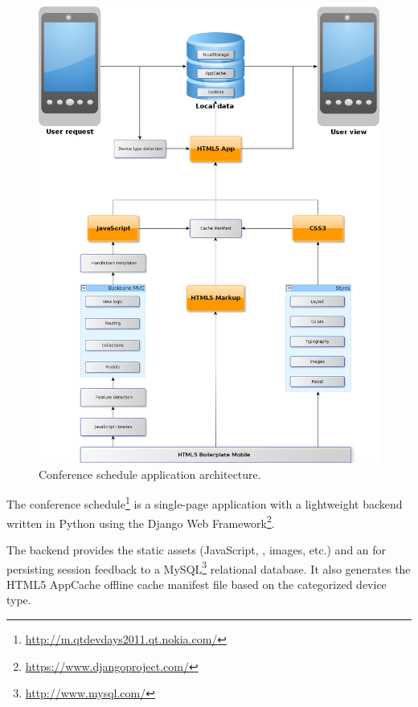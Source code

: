 \begin{figure}[ht]
  \begin{center}
    \includegraphics[width=\textwidth]{images/devdays.png}
    \caption{Conference schedule application architecture.}
    \label{figure:devdays.png}
  \end{center}
\end{figure}

The conference
schedule\footnote{\url{http://m.qtdevdays2011.qt.nokia.com/}} is a
single-page application \citationneeded with a lightweight backend
written in Python using the Django Web
Framework\footnote{\url{https://www.djangoproject.com/}}.

The backend provides the static assets (JavaScript, ,
images, etc.) and an  for persisting session feedback to a
MySQL\footnote{\url{http://www.mysql.com/}} relational database. It
also generates the HTML5 AppCache \citationneeded offline cache
manifest file based on the categorized device type.


